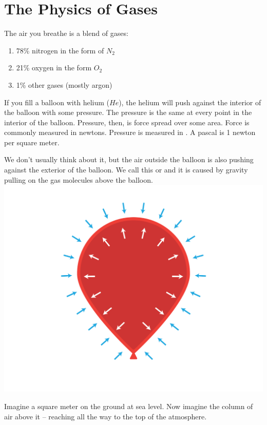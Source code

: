 \chapter{The Physics of Gases}

The air you breathe is a blend of gases:
\begin{enumerate}
\item 78\% nitrogen in the form of $N_2$
\item 21\% oxygen in the form $O_2$
\item 1\% other gases (mostly argon)
\end{enumerate}

If you fill a balloon with helium ($He$),  the helium will push against the interior of the balloon with some pressure.   
The pressure is the same at every point in the interior of the balloon.  Pressure,  then,  is force spread over some area.   
Force is commonly measured in newtons.   Pressure is measured in .  A pascal is 1 newton per square meter.

We don't usually think about it,  but the air outside the balloon is also pushing against the exterior of the balloon.  
We call this  or  and it is caused by gravity pulling on the gas molecules above the balloon.
\includegraphics[width=\textwidth]{balloon.png}


Imagine a square meter on the ground at sea level.  Now imagine the column of air above it -- reaching all the way to the top of the atmosphere.

